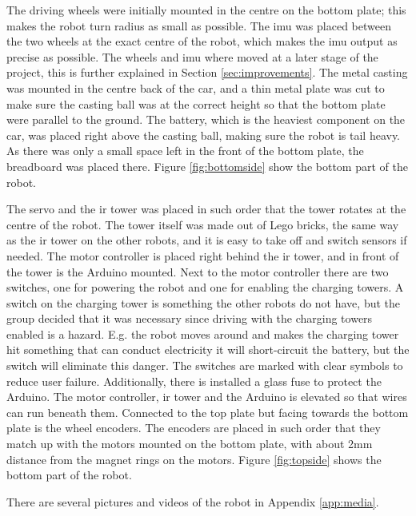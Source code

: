 The driving wheels were initially mounted in the centre on the bottom plate; this makes the robot turn radius as small as possible. The \acrshort{imu} was placed between the two wheels at the exact centre of the robot, which makes the \acrshort{imu} output as precise as possible. The wheels and \acrshort{imu} where moved at a later stage of the project, this is further explained in Section \ref{sec:improvements}. The metal casting was mounted in the centre back of the car, and a thin metal plate was cut to make sure the casting ball was at the correct height so that the bottom plate were parallel to the ground. The battery, which is the heaviest component on the car, was placed right above the casting ball, making sure the robot is tail heavy. As there was only a small space left in the front of the bottom plate, the breadboard was placed there. Figure \ref{fig:bottomside} show the bottom part of the robot.

The servo and the \acrshort{ir} tower was placed in such order that the tower rotates at the centre of the robot. The tower itself was made out of Lego bricks, the same way as the \acrshort{ir} tower on the other robots, and it is easy to take off and switch sensors if needed. The motor controller is placed right behind the \acrshort{ir} tower, and in front of the tower is the Arduino mounted. Next to the motor controller there are two switches, one for powering the robot and one for enabling the charging towers. A switch on the charging tower is something the other robots do not have, but the group decided that it was necessary since driving with the charging towers enabled is a hazard. E.g. the robot moves around and makes the charging tower hit something that can conduct electricity it will short-circuit the battery, but the switch will eliminate this danger. The switches are marked with clear symbols to reduce user failure. Additionally, there is installed a glass fuse to protect the Arduino. The motor controller, \acrshort{ir} tower and the Arduino is elevated so that wires can run beneath them. Connected to the top plate but facing towards the bottom plate is the wheel encoders. The encoders are placed in such order that they match up with the motors mounted on the bottom plate, with about 2mm distance from the magnet rings on the motors. Figure \ref{fig:topside} shows the bottom part of the robot.

There are several pictures and videos of the robot in Appendix \ref{app:media}.


